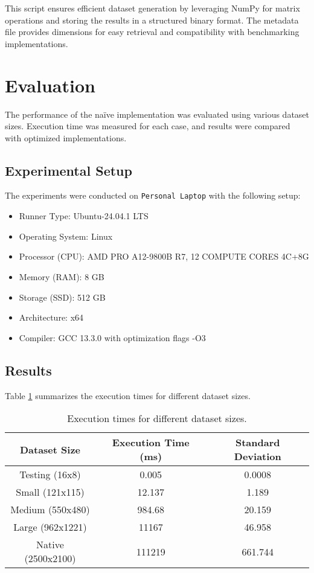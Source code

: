 \documentclass[12pt]{article}
\begin{document}
This script ensures efficient dataset generation by leveraging NumPy for matrix operations and storing the results in a structured binary format. The metadata file provides dimensions for easy retrieval and compatibility with benchmarking implementations.

\section{Evaluation}
The performance of the naïve implementation was evaluated using various dataset sizes. Execution time was measured for each case, and results were compared with optimized implementations.

\subsection{Experimental Setup}
The experiments were conducted on \texttt{Personal Laptop} with the following setup:
\begin{itemize}
    \item Runner Type: Ubuntu-24.04.1 LTS
    \item Operating System: Linux
    \item Processor (CPU): AMD PRO A12-9800B R7, 12 COMPUTE CORES 4C+8G
    \item Memory (RAM): 8 GB
    \item Storage (SSD): 512 GB
    \item Architecture: x64
    \item Compiler: GCC 13.3.0 with optimization flags -O3
\end{itemize}

\subsection{Results}
Table \ref{tab:results} summarizes the execution times for different dataset sizes.

\begin{table}[h]
    \begin{tabular}{|c|c|c|}
        \hline
        \textbf{Dataset Size} & \textbf{Execution Time (ms)} & \textbf{Standard Deviation} \\
        \hline
        Testing (16x8) & 0.005 & 0.0008 \\
        Small (121x115) & 12.137 & 1.189 \\
        Medium (550x480) & 984.68 & 20.159 \\
        Large (962x1221) & 11167 & 46.958 \\
        Native (2500x2100) & 111219 & 661.744 \\
        \hline
    \end{tabular}
        \caption{Execution times for different dataset sizes.}
        \label{tab:results}
    \end{table}
\end{document}
